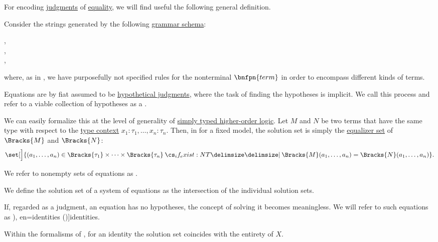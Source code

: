 \begin{definition}\label{def:equation}\mimprovised
  For encoding \hyperref[con:judgment]{judgments} of \hyperref[con:equality]{equality}, we will find useful the following general definition.

  Consider the strings generated by the following \hyperref[def:formal_grammar/schema]{grammar schema}:
  \begin{bnf*}
      {}, \\
     {}, \\
       { \bnfsp \bnftsq{\( \syneq \)} \bnfsp {}},
  \end{bnf*}
  where, as in , we have purposefully not specified rules for the nonterminal \( \bnfpn{term} \) in order to encompass different kinds of terms.

  \begin{thmenum}
     Equations are by fiat assumed to be \hyperref[con:hypothetical_judgment]{hypothetical judgments}, where the task of finding the hypotheses is implicit. We call this process  and refer to a viable collection of hypotheses as a .

    We can easily formalize this at the level of generality of \hyperref[def:simply_typed_hol]{simply typed higher-order logic}. Let \( M \) and \( N \) be two terms that have the same type with respect to the \hyperref[def:type_context]{type context} \( x_1: \tau_1, \ldots, x_n: \tau_n \). Then, in for a fixed model, the solution set is simply the \hyperref[def:equalizers]{equalizer set} of \( \Bracks{M} \) and \( \Bracks{N} \):
    \begin{equation}\label{eq:def:equation/solution}
      \set[\Big]{ (a_1, \ldots, a_n) \in \Bracks{\tau_1} \times \cdots \times \Bracks{\tau_n} \given* \Bracks{M}(a_1, \ldots, a_n) = \Bracks{N}(a_1, \ldots, a_n) }.
    \end{equation}

     We refer to nonempty sets of equations as .

    We define the solution set of a system of equations as the intersection of the individual solution sets.

     If, regarded as a judgment, an equation has no hypotheses, the concept of solving it becomes meaningless. We will refer to such equations as \term[bg=тъждества (\cite[2]{Обрешков1962ВисшаАлгебра}), en=identities (\cite[50]{BaaderNipkow2012TermRewriting})]{identities}.

    Within the formalisms of , for an identity the solution set coincides with the entirety of \( X \).
  \end{thmenum}
\end{definition}
